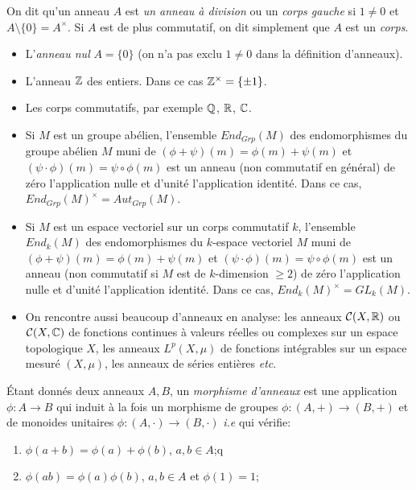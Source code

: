 On dit qu'un anneau $A$ est \emph{un anneau à division} ou un \emph{corps
gauche} si $1\not=0$ et $A\setminus \lbrace 0\rbrace=A^\times$. Si $A$ est de
plus commutatif, on dit simplement que $A$ est un \emph{corps}.

\begin{exemples}
    \begin{itemize}[leftmargin=* ,parsep=0cm,itemsep=0cm,topsep=0cm]
        \item L'\emph{anneau nul} $A=\lbrace 0\rbrace$ (on n'a pas exclu
            $1\not=0$ dans la définition d'anneaux).
        \item L'anneau  $\mathbb{Z}$ des entiers. Dans ce cas  $\mathbb{Z}^\times=\lbrace \pm
            1\rbrace$.
        \item Les corps commutatifs, par exemple $\mathbb{Q}$, $\mathbb{R}$, $\mathbb{C}$.  
        \item Si $M$ est un groupe abélien, l'ensemble $End_{Grp}(M)$ des
            endomorphismes du groupe abélien $M$ muni de
            $(\phi+\psi)(m)=\phi(m)+\psi(m)$ et $(\psi\cdot\phi)(m)=\psi\circ
            \phi(m)$ est  un anneau (non commutatif en général) de zéro
            l'application nulle et d'unité l'application identité. Dans ce cas,
            $End_{Grp}(M)^\times=Aut_{Grp}(M)$.  
        \item Si $M$ est un espace vectoriel sur un corps commutatif $k$,
            l'ensemble $End_k(M)$ des endomorphismes du $k$-espace vectoriel
            $M$ muni de $(\phi+\psi)(m)=\phi(m)+\psi(m)$ et
            $(\psi\cdot\phi)(m)=\psi\circ \phi(m)$ est un anneau (non
            commutatif si $M$ est de $k$-dimension $\geq 2$) de zéro
            l'application nulle et d'unité l'application identité. Dans ce cas,
            $End_k(M)^\times=GL_k(M)$.
        \item On rencontre aussi beaucoup d'anneaux en analyse: les anneaux
            $\mathcal{C}(X,\mathbb{R})$ ou $\mathcal{C}(X,\mathbb{C})$ de fonctions continues à
            valeurs réelles  ou complexes sur un espace topologique $X$, les
            anneaux $L^p(X,\mu)$ de fonctions intégrables  sur un espace mesuré
            $(X,\mu)$, les anneaux de séries entières \textit{etc}.
    \end{itemize}
\end{exemples}

\begin{definition}
    Étant donnés deux anneaux $A,B$, un \emph{morphisme d'anneaux} est une
    application $\phi:A\rightarrow B$ qui induit à la fois un morphisme de
    groupes $\phi:(A,+)\rightarrow (B,+)$ et de monoides unitaires
    $\phi:(A,\cdot)\rightarrow (B,\cdot)$ \textit{i.e} qui vérifie:
    \begin{enumerate}
        \item $\phi(a+b)=\phi(a)+\phi(b)$, $a,b\in A$;q
        \item $\phi(a  b)=\phi(a) \phi(b)$, $a,b\in A$ et $\phi(1)=1$;
    \end{enumerate}
\end{definition}

